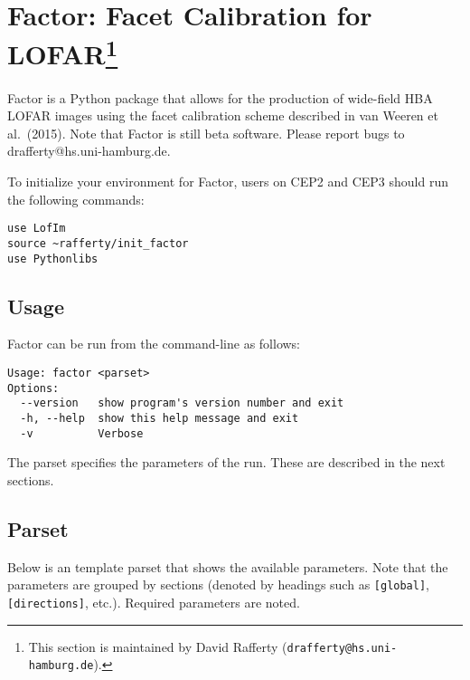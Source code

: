 \documentclass[structabstract]{article}
\begin{document}

\section[Factor: Facet Calibration for LOFAR]{Factor: Facet Calibration for
LOFAR\footnote{This section is maintained by David Rafferty
({\tt drafferty@hs.uni-hamburg.de}).}}
\label{factor}

Factor is a Python package that allows for the production of wide-field HBA
LOFAR images using the facet calibration scheme described in van Weeren et al.\
(2015). Note that Factor is still beta software. Please report bugs to
drafferty@hs.uni-hamburg.de.

To initialize your environment for Factor, users on CEP2 and CEP3 should run the
following commands:
\begin{verbatim}
use LofIm
source ~rafferty/init_factor
use Pythonlibs
\end{verbatim}

\subsection{Usage}
\label{factor:usage}

Factor can be run from the command-line as follows:
\begin{verbatim}
Usage: factor <parset>
Options:
  --version   show program's version number and exit
  -h, --help  show this help message and exit
  -v          Verbose
\end{verbatim}
The parset specifies the parameters of the run. These are described in the next
sections.

\subsection{Parset}
\label{factor:parset}

Below is an template parset that shows the available parameters. Note that the
parameters are grouped by sections (denoted by headings such as {\tt [global]},
{\tt [directions]}, etc.). Required parameters are noted.
\end{document}
